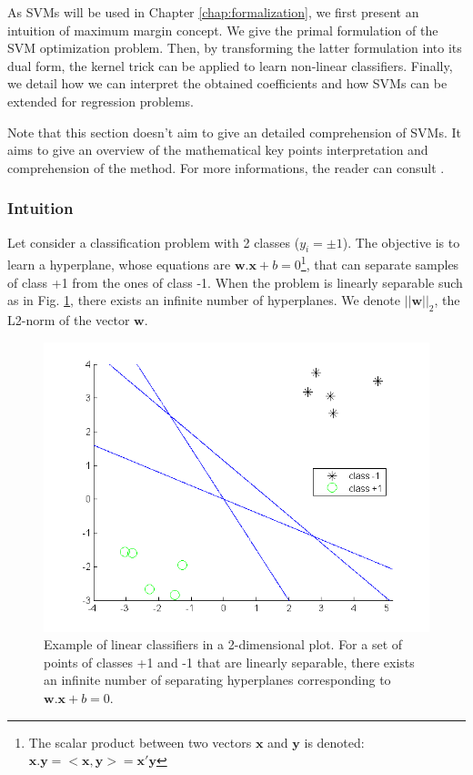 As SVMs will be used in Chapter \ref{chap:formalization}, we first present an intuition of maximum margin concept. We give the primal formulation of the SVM optimization problem. Then, by transforming the latter formulation into its dual form, the kernel trick can be applied to learn non-linear classifiers. Finally, we detail how we can interpret the obtained coefficients and how SVMs can be extended for regression problems.

Note that this section doesn't aim to give an detailed comprehension of SVMs. It aims to give an overview of the mathematical key points interpretation and comprehension of the method. For more informations, the reader can consult \cite{Schlkopf2013,Campbell2011,Cortes1995}.

\subsubsection{Intuition}
Let consider a classification problem with 2 classes ($y_i= \pm 1$). The objective is to learn a hyperplane, whose equations are $\textbf{w}. \textbf{x} + b = 0$\footnote{The scalar product between two vectors $\textbf{x}$ and $\textbf{y}$ is denoted: $\textbf{x}.\textbf{y} = <\textbf{x},\textbf{y}> = \textbf{x}'\textbf{y}$}, that can separate samples of class +1 from the ones of class -1. When the problem is linearly separable such as in Fig. \ref{fig:Plusieurs_separatrice_lineaire}, there exists an infinite number of hyperplanes. We denote $||\textbf{w}||_2$, the L2-norm of the vector $\textbf{w}$.

\begin{figure}[h!]
\centering
\includegraphics[width=0.6\linewidth]{images/Plusieurs_separatrice_lineaire2}
\caption{Example of linear classifiers in a 2-dimensional plot. For a set of points of classes +1 and -1 that are linearly separable, there exists an infinite number of separating hyperplanes corresponding to $\textbf{w}.\textbf{x} + b = 0.$}
\label{fig:Plusieurs_separatrice_lineaire}
\end{figure}

